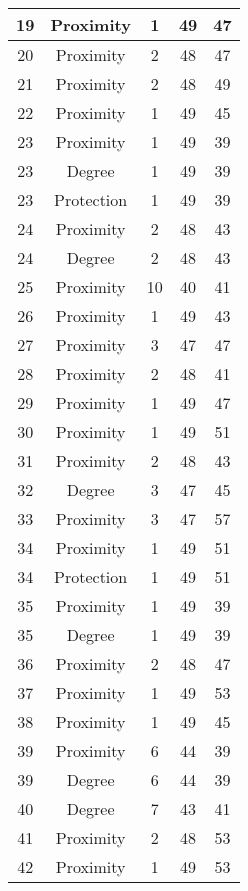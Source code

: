 \documentclass[results.tex]{subfiles}
\begin{document}
\begin{center}
\begin{tabular}{| c || c | c | c | c |}
    \hline
    19 & Proximity & 1 & 49 & 47 \\ 
    \hline
    20 & Proximity & 2 & 48 & 47 \\ 
    \hline
    21 & Proximity & 2 & 48 & 49 \\ 
    \hline
    22 & Proximity & 1 & 49 & 45 \\ 
    \hline
    23 & Proximity & 1 & 49 & 39 \\ 
    \hline
    23 & Degree & 1 & 49 & 39 \\ 
    \hline
    23 & Protection & 1 & 49 & 39 \\ 
    \hline
    24 & Proximity & 2 & 48 & 43 \\ 
    \hline
    24 & Degree & 2 & 48 & 43 \\ 
    \hline
    25 & Proximity & 10 & 40 & 41 \\ 
    \hline
    26 & Proximity & 1 & 49 & 43 \\ 
    \hline
    27 & Proximity & 3 & 47 & 47 \\ 
    \hline
    28 & Proximity & 2 & 48 & 41 \\ 
    \hline
    29 & Proximity & 1 & 49 & 47 \\ 
    \hline
    30 & Proximity & 1 & 49 & 51 \\ 
    \hline
    31 & Proximity & 2 & 48 & 43 \\ 
    \hline
    32 & Degree & 3 & 47 & 45 \\ 
    \hline
    33 & Proximity & 3 & 47 & 57 \\ 
    \hline
    34 & Proximity & 1 & 49 & 51 \\ 
    \hline
    34 & Protection & 1 & 49 & 51 \\ 
    \hline
    35 & Proximity & 1 & 49 & 39 \\ 
    \hline
    35 & Degree & 1 & 49 & 39 \\ 
    \hline
    36 & Proximity & 2 & 48 & 47 \\ 
    \hline
    37 & Proximity & 1 & 49 & 53 \\ 
    \hline
    38 & Proximity & 1 & 49 & 45 \\ 
    \hline
    39 & Proximity & 6 & 44 & 39 \\ 
    \hline
    39 & Degree & 6 & 44 & 39 \\ 
    \hline
    40 & Degree & 7 & 43 & 41 \\ 
    \hline
    41 & Proximity & 2 & 48 & 53 \\ 
    \hline
    42 & Proximity & 1 & 49 & 53 \\ 

\end{tabular}
\end{center}
\end{document}
